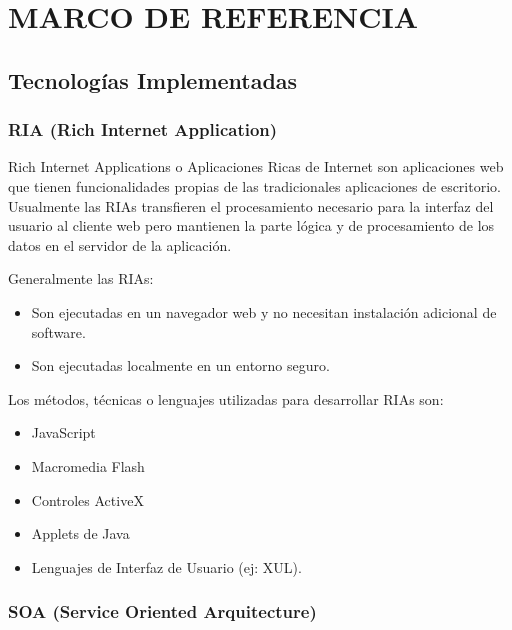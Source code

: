 \section{MARCO DE REFERENCIA}

\subsection{Tecnologías Implementadas}

\label{tec:all}

\subsubsection{RIA (Rich Internet Application)}
\label{tec:ria}

Rich Internet Applications o Aplicaciones Ricas de Internet son aplicaciones web que tienen funcionalidades propias de las tradicionales aplicaciones de escritorio. Usualmente las RIAs transfieren el procesamiento necesario para la interfaz del usuario al cliente web pero mantienen la parte lógica y de procesamiento de los datos en el servidor de la aplicación.

Generalmente las RIAs:

\begin{itemize}
	
	\item Son ejecutadas en un navegador web y no necesitan instalación adicional de software.
	
	\item Son ejecutadas localmente en un entorno seguro.
	
\end{itemize}

Los métodos, técnicas o lenguajes utilizadas para desarrollar RIAs son:

\begin{itemize}
	\item JavaScript
	\item Macromedia Flash
	\item Controles ActiveX
	\item Applets de Java
	\item Lenguajes de Interfaz de Usuario (ej: XUL).
\end{itemize}

\subsubsection{SOA (Service Oriented Arquitecture)}
\label{tec:soa}

